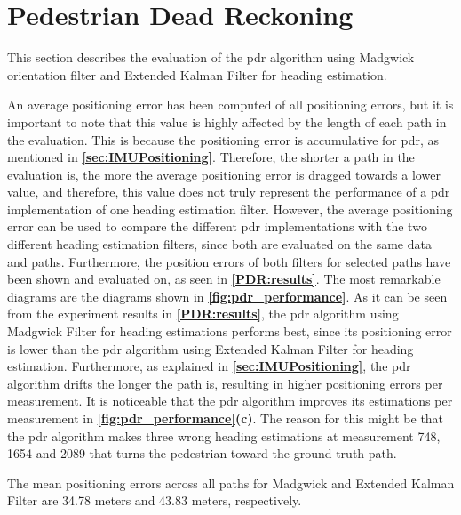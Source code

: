 \section{Pedestrian Dead Reckoning} \label{sec:IMUPositioning_eval}
This section describes the evaluation of the \gls{pdr} algorithm using Madgwick orientation filter and Extended Kalman Filter for heading estimation.

An average positioning error has been computed of all positioning errors, but it is important to note that this value is highly affected by the length of each path in the evaluation. This is because the positioning error is accumulative for \gls{pdr}, as mentioned in \textbf{\autoref{sec:IMUPositioning}}. Therefore, the shorter a path in the evaluation is, the more the average positioning error is dragged towards a lower value, and therefore, this value does not truly represent the performance of a \gls{pdr} implementation of one heading estimation filter. However, the average positioning error can be used to compare the different \gls{pdr} implementations with the two different heading estimation filters, since both are evaluated on the same data and paths. Furthermore, the position errors of both filters for selected paths have been shown and evaluated on, as seen in \textbf{\autoref{PDR:results}}. The most remarkable diagrams are the diagrams shown in \textbf{\autoref{fig:pdr_performance}}. As it can be seen from the experiment results in \textbf{\autoref{PDR:results}}, the \gls{pdr} algorithm using Madgwick Filter for heading estimations performs best, since its positioning error is lower than the \gls{pdr} algorithm using Extended Kalman Filter for heading estimation. Furthermore, as explained in \textbf{\autoref{sec:IMUPositioning}}, the \gls{pdr} algorithm drifts the longer the path is, resulting in higher positioning errors per measurement. It is noticeable that the \gls{pdr} algorithm improves its estimations per measurement in \textbf{\autoref{fig:pdr_performance}(c)}. The reason for this might be that the \gls{pdr} algorithm makes three wrong heading estimations at measurement 748, 1654 and 2089 that turns the pedestrian toward the ground truth path.

The mean positioning errors across all paths for Madgwick and Extended Kalman Filter are 34.78 meters and 43.83 meters, respectively.


